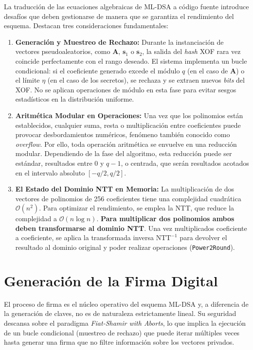 \documentclass[11pt, a4paper]{report}
\theoremstyle{definition}
\begin{document}
La traducción de las ecuaciones algebraicas de ML-DSA a código fuente introduce desafíos que deben gestionarse de manera que se  garantiza el rendimiento del esquema. Destacan tres consideraciones fundamentales:

\begin{enumerate}
    \item \textbf{Generación y Muestreo de Rechazo:} Durante la instanciación de vectores pseudoaleatorios, como $\mathbf{A}$, $\mathbf{s}_1$ o $\mathbf{s}_2$, la salida del \textit{hash} XOF rara vez coincide perfectamente con el rango deseado. El sistema implementa un bucle condicional: si el coeficiente generado excede el módulo $q$ (en el caso de $\mathbf{A}$) o el límite $\eta$ (en el caso de los secretos), se rechaza y se extraen nuevos \textit{bits} del XOF. No se aplican operaciones de módulo en esta fase para evitar sesgos estadísticos en la distribución uniforme.
    
    \item \textbf{Aritmética Modular en Operaciones:} Una vez que los polinomios están establecidos, cualquier suma, resta o multiplicación entre coeficientes puede provocar desbordamientos numéricos, fenómeno también conocido como \textit{overflow}. Por ello, toda operación aritmética se envuelve en una reducción modular. Dependiendo de la fase del algoritmo, esta reducción puede ser estándar, resultados entre $0$ y $q-1$, o centrada, que serán resultados acotados en el intervalo absoluto $[-q/2, q/2]$.
    
    \item \textbf{El Estado del Dominio NTT en Memoria:} La multiplicación de dos vectores de polinomios de 256 coeficientes tiene una complejidad cuadrática $\mathcal{O}(n^2)$. Para optimizar el rendimiento, se emplea la NTT, que reduce la complejidad a $\mathcal{O}(n \log n)$. \textbf{Para multiplicar dos polinomios ambos deben transformarse al dominio NTT}. Una vez multiplicados coeficiente a coeficiente, se aplica la transformada inversa $\text{NTT}^{-1}$ para devolver el resultado al dominio original y poder realizar operaciones (\texttt{Power2Round}). 
\end{enumerate}

\section{Generación de la Firma Digital}

El proceso de firma es el núcleo operativo del esquema ML-DSA y, a diferencia de la generación de claves, no es de naturaleza estrictamente lineal. Su seguridad descansa sobre el paradigma \textit{Fiat-Shamir with Aborts}, lo que implica la ejecución de un bucle condicional (muestreo de rechazo) que puede iterar múltiples veces hasta generar una firma que no filtre información sobre los vectores privados.
\end{document}
